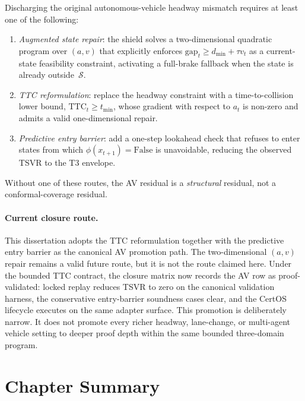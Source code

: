 \begin{corollary}
\label{cor:av-promotion}
Discharging the original autonomous-vehicle headway mismatch requires at
least one of the following:
\begin{enumerate}[label=(\alph*)]
  \item \emph{Augmented state repair}: the shield solves a two-dimensional
    quadratic program over $(a, v)$ that explicitly enforces
    $\mathrm{gap}_t \ge d_{\min} + \tau v_t$ as a current-state feasibility
    constraint, activating a full-brake fallback when the state is already
    outside~$\mathcal{S}$.
  \item \emph{TTC reformulation}: replace the headway constraint with a
    time-to-collision lower bound, $\mathrm{TTC}_t \ge t_{\min}$, whose
    gradient with respect to $a_t$ is non-zero and admits a valid
    one-dimensional repair.
  \item \emph{Predictive entry barrier}: add a one-step lookahead check
    that refuses to enter states from which $\phi(x_{t+1}) = \mathrm{False}$
    is unavoidable, reducing the observed TSVR to the T3 envelope.
\end{enumerate}
Without one of these routes, the AV residual is a \emph{structural} residual,
not a conformal-coverage residual.
\end{corollary}

\paragraph{Current closure route.}
This dissertation adopts the TTC reformulation together with the predictive
entry barrier as the canonical AV promotion path.  The two-dimensional
$(a,v)$ repair remains a valid future route, but it is not the route claimed
here.  Under the bounded TTC contract, the closure matrix now records the AV
row as proof-validated: locked replay reduces TSVR to zero on the canonical
validation harness, the conservative entry-barrier soundness cases clear, and
the CertOS lifecycle executes on the same adapter surface.  This promotion is
deliberately narrow.  It does not promote every richer headway, lane-change,
or multi-agent vehicle setting to deeper proof depth within the same bounded
three-domain program.

\section{Chapter Summary}
\label{sec:ch37-summary}

